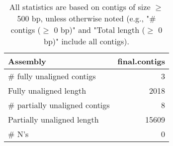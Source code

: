 \documentclass[12pt,a4paper]{article}
\begin{document}
\begin{table}[ht]
\begin{center}
\caption{All statistics are based on contigs of size $\geq$ 500 bp, unless otherwise noted (e.g., "\# contigs ($\geq$ 0 bp)" and "Total length ($\geq$ 0 bp)" include all contigs).}
\begin{tabular}{|l*{1}{|r}|}
\hline
Assembly & final.contigs \\ \hline
\# fully unaligned contigs & 3 \\ \hline
Fully unaligned length & 2018 \\ \hline
\# partially unaligned contigs & 8 \\ \hline
Partially unaligned length & 15609 \\ \hline
\# N's & 0 \\ \hline
\end{tabular}
\end{center}
\end{table}
\end{document}
